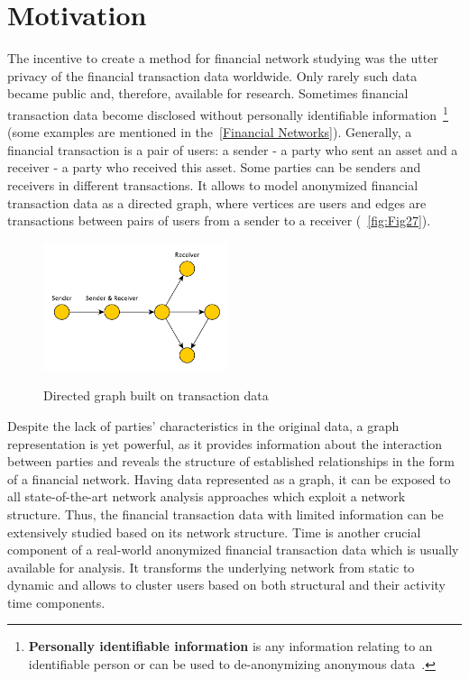 \section{Motivation}
\label{Motivation}
The incentive to create a method for financial network studying was the utter privacy of the financial transaction data worldwide. Only rarely such data became public and, therefore, available for research. Sometimes financial transaction data become disclosed without personally identifiable information~\footnote{\textbf{Personally identifiable information} is any information relating to an identifiable person or can be used to de-anonymizing anonymous data~\cite{McCallister:2010:SGP:2206206}.} (some examples are mentioned in the~\ref{Financial Networks}). Generally, a financial transaction is a pair of users: a sender - a party who sent an asset and a receiver - a party who received this asset. Some parties can be senders and receivers in different transactions. It allows to model anonymized financial transaction data as a directed graph, where vertices are users and edges are transactions between pairs of users from a sender to a receiver (~\autoref{fig:Fig27}). 

\begin{figure}[!ht]
	\centering
	\includegraphics[width=0.48\textwidth]{images/Fig27.pdf}\\
	\caption{Directed graph built on transaction data}
	\label{fig:Fig27}
\end{figure}

Despite the lack of parties' characteristics in the original data, a graph representation is yet powerful, as it provides information about the interaction between parties and reveals the structure of established relationships in the form of a financial network. Having data represented as a graph, it can be exposed to all state-of-the-art network analysis approaches which exploit a network structure. Thus, the financial transaction data with limited information can be extensively studied based on its network structure.
Time is another crucial component of a real-world anonymized financial transaction data which is usually available for analysis. It transforms the underlying network from static to dynamic and allows to cluster users based on both structural and their activity time components.

